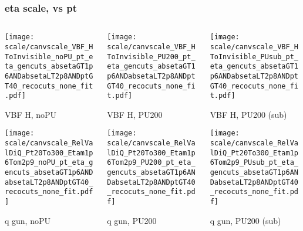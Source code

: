 \documentclass[8pt]{beamer}
\begin{document}
  \begin{frame}
  \frametitle{eta scale, vs pt}
  
  \begin{columns}
   \begin{column}{0.35\textwidth}
     \texttt{[image: scale/canvscale\_VBF\_HToInvisible\_noPU\_pt\_eta\_gencuts\_absetaGT1p6ANDabsetaLT2p8ANDptGT40\_recocuts\_none\_fit.pdf]}
     
     VBF H, noPU
    
     \texttt{[image: scale/canvscale\_RelValDiQ\_Pt20To300\_Etam1p6Tom2p9\_noPU\_pt\_eta\_gencuts\_absetaGT1p6ANDabsetaLT2p8ANDptGT40\_recocuts\_none\_fit.pdf]}
     
     q gun, noPU
   \end{column}
   \begin{column}{0.35\textwidth}
     \texttt{[image: scale/canvscale\_VBF\_HToInvisible\_PU200\_pt\_eta\_gencuts\_absetaGT1p6ANDabsetaLT2p8ANDptGT40\_recocuts\_none\_fit.pdf]}
     
     VBF H, PU200
    
     \texttt{[image: scale/canvscale\_RelValDiQ\_Pt20To300\_Etam1p6Tom2p9\_PU200\_pt\_eta\_gencuts\_absetaGT1p6ANDabsetaLT2p8ANDptGT40\_recocuts\_none\_fit.pdf]}
     
     q gun, PU200
   \end{column}
   \begin{column}{0.35\textwidth}
     \texttt{[image: scale/canvscale\_VBF\_HToInvisible\_PUsub\_pt\_eta\_gencuts\_absetaGT1p6ANDabsetaLT2p8ANDptGT40\_recocuts\_none\_fit.pdf]}
     
     VBF H, PU200 (sub)
    
     \texttt{[image: scale/canvscale\_RelValDiQ\_Pt20To300\_Etam1p6Tom2p9\_PUsub\_pt\_eta\_gencuts\_absetaGT1p6ANDabsetaLT2p8ANDptGT40\_recocuts\_none\_fit.pdf]}
     
     q gun, PU200 (sub)
   \end{column}
  \end{columns}
 \end{frame}
 
\end{document}
